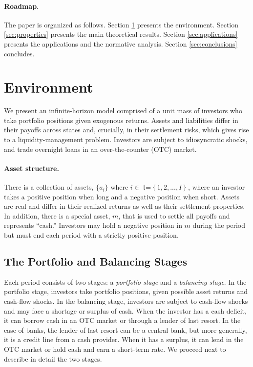 \documentclass[12pt,american,english,notitlepage]{article}
\begin{document}
\paragraph{Roadmap.} The paper is organized as follows. Section \ref{sec:model} presents the environment. Section \ref{sec:properties} presents the main theoretical results. Section \ref{sec:applications} presents the applications and the normative analysis. Section \ref{sec:conclusions} concludes.

\section{Environment}

\label{sec:model}
We present an infinite-horizon model comprised of a unit mass of investors who take portfolio positions given exogenous returns. Assets and liabilities
differ in their payoffs across states and, crucially, in their settlement
risks, which gives rise to a liquidity-management problem. Investors
are subject to idiosyncratic shocks, and trade overnight loans in
an over-the-counter (OTC) market.

\paragraph{Asset structure.}

There is a collection of assets, $\{a_{i}\}$ where $i\in$ $\mathbb{I}$=$\left\{ 1,2,...,I\right\} $,
where an investor takes a positive position when long and a negative
position when short. Assets are real and differ in their realized returns as well as their settlement properties. In addition, there
is a special asset, $m$, that is used to settle all payoffs and represents
``cash.'' Investors may hold a negative position in $m$ during the
period but must end each period with a strictly positive position. 

\subsection{The Portfolio and Balancing Stages}

Each period consists of two stages: a \textit{portfolio stage} and
a \textit{balancing stage}. In the portfolio stage, investors take
portfolio positions, given possible asset returns and cash-flow shocks.
In the balancing stage, investors are subject to cash-flow shocks
and may face a shortage or surplus of cash. When the investor has
a cash deficit, it can borrow cash in an OTC market or through a lender
of last resort. In the case of banks, the lender of last resort can
be a central bank, but more generally, it is a credit line from a
cash provider. When it has a surplus, it can lend in the OTC market
or hold cash and earn a short-term rate. We proceed next to describe
in detail the two stages.
\end{document}
